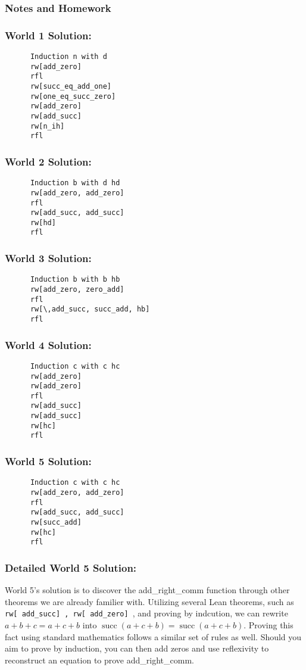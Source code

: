 \documentclass{article}
\DeclareMathOperator{\successor}{succ}
\theoremstyle{theorem}
\theoremstyle{definition}
\theoremstyle{remark}
\begin{document}
  \subsubsection{Notes and Homework}
    \subsubsection*{World 1 Solution:}
    \begin{lstlisting}
      Induction n with d
      rw[add_zero]
      rfl
      rw[succ_eq_add_one]
      rw[one_eq_succ_zero]
      rw[add_zero]
      rw[add_succ]
      rw[n_ih]
      rfl
    \end{lstlisting}
    \subsubsection*{World 2 Solution:}
    \begin{lstlisting}
      Induction b with d hd
      rw[add_zero, add_zero]
      rfl
      rw[add_succ, add_succ]
      rw[hd]
      rfl
    \end{lstlisting}
    \subsubsection*{World 3 Solution:}
    \begin{lstlisting}
      Induction b with b hb
      rw[add_zero, zero_add]
      rfl
      rw[\,add_succ, succ_add, hb]
      rfl
    \end{lstlisting}
    \subsubsection*{World 4 Solution:}
    \begin{lstlisting}
      Induction c with c hc
      rw[add_zero]
      rw[add_zero]
      rfl
      rw[add_succ]
      rw[add_succ]
      rw[hc]
      rfl
    \end{lstlisting}
    \subsubsection*{World 5 Solution:}
    \begin{lstlisting}
      Induction c with c hc
      rw[add_zero, add_zero]
      rfl
      rw[add_succ, add_succ]
      rw[succ_add]
      rw[hc]
      rfl
    \end{lstlisting}

  \subsubsection*{Detailed World 5 Solution:}
    World 5's solution is to discover the add\_right\_comm function through other theorems we are already familier with. Utilizing several Lean theorems, such as \texttt{rw[\,add\_succ]\,, rw[\,add\_zero]\,}, and proving by indcution, we can rewrite $a+b+c = a+c+b$ into $\successor (a+c+b) = \successor  (a+c+b)$. Proving this fact using standard mathematics follows a similar set of rules as well. Should you aim to prove by induction, you can then add zeros and use reflexivity to reconstruct an equation to prove add\_right\_comm.
\end{document}
